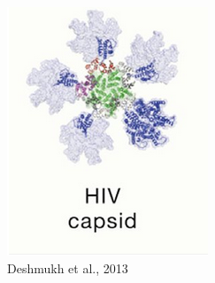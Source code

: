 \begin{frame}
    \begin{figure}[h]
        \centering
        \begin{subfigure}[b]{0.3\textwidth}
            \centering
            \includegraphics[width=\textwidth]{images/one.png}
            \caption{Deshmukh et al., 2013}
            \label{fig:image1}
        \end{subfigure}
        \hfill
        \begin{subfigure}[b]{0.3\textwidth}
            \centering

\end{subfigure}
\end{figure}
\end{frame}
